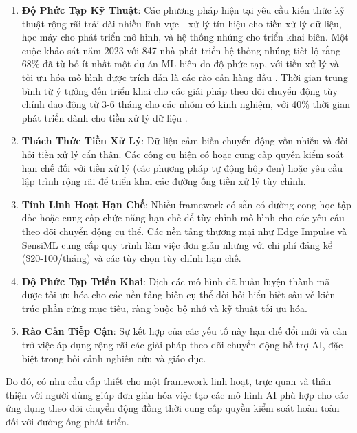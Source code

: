 \begin{enumerate}
\item \textbf{Độ Phức Tạp Kỹ Thuật}: Các phương pháp hiện tại yêu cầu kiến thức kỹ thuật rộng rãi trải dài nhiều lĩnh vực—xử lý tín hiệu cho tiền xử lý dữ liệu, học máy cho phát triển mô hình, và hệ thống nhúng cho triển khai biên. Một cuộc khảo sát năm 2023 với 847 nhà phát triển hệ thống nhúng tiết lộ rằng 68\% đã từ bỏ ít nhất một dự án ML biên do độ phức tạp, với tiền xử lý và tối ưu hóa mô hình được trích dẫn là các rào cản hàng đầu \cite{merenda2020edge}. Thời gian trung bình từ ý tưởng đến triển khai cho các giải pháp theo dõi chuyển động tùy chỉnh dao động từ 3-6 tháng cho các nhóm có kinh nghiệm, với 40\% thời gian phát triển dành cho tiền xử lý dữ liệu \cite{warden2019tinyml}.

\item \textbf{Thách Thức Tiền Xử Lý}: Dữ liệu cảm biến chuyển động vốn nhiễu và đòi hỏi tiền xử lý cẩn thận. Các công cụ hiện có hoặc cung cấp quyền kiểm soát hạn chế đối với tiền xử lý (các phương pháp tự động hộp đen) hoặc yêu cầu lập trình rộng rãi để triển khai các đường ống tiền xử lý tùy chỉnh.

\item \textbf{Tính Linh Hoạt Hạn Chế}: Nhiều framework có sẵn có đường cong học tập dốc hoặc cung cấp chức năng hạn chế để tùy chỉnh mô hình cho các yêu cầu theo dõi chuyển động cụ thể. Các nền tảng thương mại như Edge Impulse và SensiML cung cấp quy trình làm việc đơn giản nhưng với chi phí đáng kể (\$20-100/tháng) và các tùy chọn tùy chỉnh hạn chế.

\item \textbf{Độ Phức Tạp Triển Khai}: Dịch các mô hình đã huấn luyện thành mã được tối ưu hóa cho các nền tảng biên cụ thể đòi hỏi hiểu biết sâu về kiến trúc phần cứng mục tiêu, ràng buộc bộ nhớ và kỹ thuật tối ưu hóa.

\item \textbf{Rào Cản Tiếp Cận}: Sự kết hợp của các yếu tố này hạn chế đổi mới và cản trở việc áp dụng rộng rãi các giải pháp theo dõi chuyển động hỗ trợ AI, đặc biệt trong bối cảnh nghiên cứu và giáo dục.

\end{enumerate}

Do đó, có nhu cầu cấp thiết cho một framework linh hoạt, trực quan và thân thiện với người dùng giúp đơn giản hóa việc tạo các mô hình AI phù hợp cho các ứng dụng theo dõi chuyển động đồng thời cung cấp quyền kiểm soát hoàn toàn đối với đường ống phát triển.

